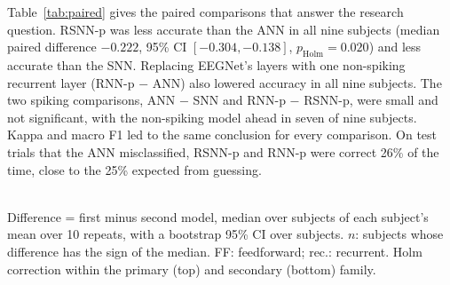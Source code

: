 \documentclass[conference]{IEEEtran}
\begin{document}
Table~\ref{tab:paired} gives the paired comparisons that answer the research question. RSNN-p was less accurate than the ANN in all nine subjects (median paired difference $-0.222$, 95\% CI $[-0.304, -0.138]$, $p_\mathrm{Holm} = 0.020$) and less accurate than the SNN. Replacing EEGNet's layers with one non-spiking recurrent layer (RNN-p $-$ ANN) also lowered accuracy in all nine subjects. The two spiking comparisons, ANN $-$ SNN and RNN-p $-$ RSNN-p, were small and not significant, with the non-spiking model ahead in seven of nine subjects. Kappa and macro F1 led to the same conclusion for every comparison. On test trials that the ANN misclassified, RSNN-p and RNN-p were correct 26\% of the time, close to the 25\% expected from guessing.

\begin{table}[!t]
  \centering
  \caption{Paired differences in session-2 accuracy}
  \label{tab:paired}
  \setlength{\tabcolsep}{3pt}
  \\[2pt]
  \footnotesize Difference = first minus second model, median over subjects of each subject's mean over 10 repeats, with a bootstrap 95\% CI over subjects. $n$: subjects whose difference has the sign of the median. FF: feedforward; rec.: recurrent. Holm correction within the primary (top) and secondary (bottom) family.
\end{table}
\end{document}
